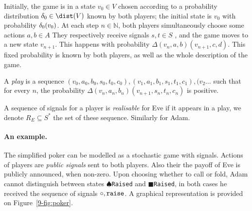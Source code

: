 \newcommand{\NN}{\mathbb{N}}
\newcommand{\RR}{\mathbb{R}}


Initially, the game is in a state $v_0 \in V$ chosen according to a probability distribution
$\ini\in\dist(V)$ known by both players; the initial state is
$v_0$ with probability $\delta_0(v_0)$.  At each step $n\in\NN$, both players
simultaneously choose some actions $a,b \in A$
 They respectively receive signals
$s,t \in S$ ,
 and the game moves to a
new state $v_{n+1}$.  This happens with probability
$\Delta(v_{n},a,b)(v_{n+1},c,d)$.
{This fixed probability is known by both players,
as well as the whole description of the game.}

A \emph{play} is a sequence $(v_0,a_0,b_0,s_0,t_0,c_0),(v_1,a_1,b_1,s_1,t_1,c_1),(v_2\ldots$
such that for every $n$, the probability $\Delta(v_{n},a_n,b_n)(v_{n+1},s_n,t_n,c_n)$
is positive.

A sequence of signals for a player
is \emph{realisable} for Eve if it appears in a play,
we denote $R_E \subseteq S^*$ the set of these sequence.
Similarly for Adam.


\paragraph{An example.}
The simplified poker can be 
modelled as a stochastic game with signals.
Actions of players are \emph{public signals}
sent to both players.
Also their the payoff of Eve is publicly announced,
when non-zero. 
Upon choosing whether to call or fold,
Adam cannot distinguish between states
$\spadesuit${\tt Raised} and $\blacksquare${\tt Raised},
in both cases he received the sequence of signals $\circ,{\tt raise}$.
A graphical representation is provided on
Figure~\ref{9-fig:poker}.

\newcommand{\pay}{ {\tt pay}}


